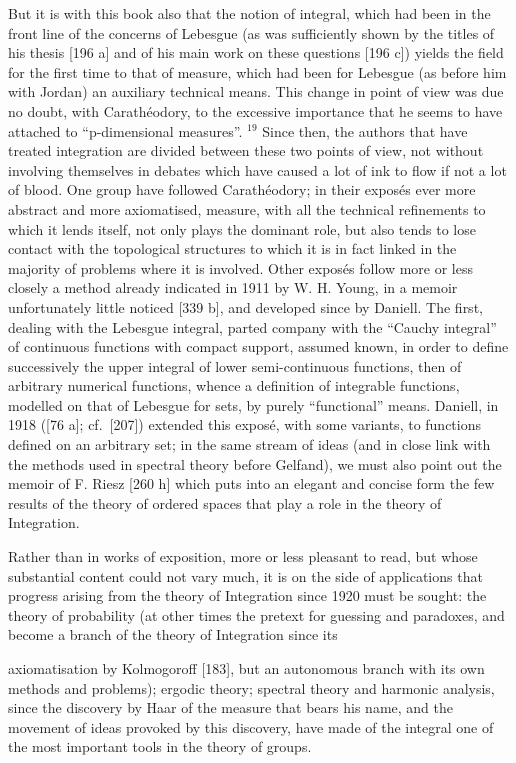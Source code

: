 But it is with this book also that the notion of integral, which had been in the front line of the concerns of Lebesgue (as was sufficiently shown by the titles of his thesis {[}196 a{]} and of his main work on these questions {[}196 c{]}) yields the field for the first time to that of measure, which had been for Lebesgue (as before him with Jordan) an auxiliary technical means. This change in point of view was due no doubt, with Carathéodory, to the excessive importance that he seems to have attached to ``p-dimensional measures''. \(^{19}\) Since then, the authors that have treated integration are divided between these two points of view, not without involving themselves in debates which have caused a lot of ink to flow if not a lot of blood. One group have followed Carathéodory; in their exposés ever more abstract and more axiomatised, measure, with all the technical refinements to which it lends itself, not only plays the dominant role, but also tends to lose contact with the topological structures to which it is in fact linked in the majority of problems where it is involved. Other exposés follow more or less closely a method already indicated in 1911 by W. H. Young, in a memoir unfortunately little noticed {[}339 b{]}, and developed since by Daniell. The first, dealing with the Lebesgue integral, parted company with the ``Cauchy integral'' of continuous functions with compact support, assumed known, in order to define successively the upper integral of lower semi-continuous functions, then of arbitrary numerical functions, whence a definition of integrable functions, modelled on that of Lebesgue for sets, by purely ``functional'' means. Daniell, in 1918 ({[}76 a{]}; cf.~{[}207{]}) extended this exposé, with some variants, to functions defined on an arbitrary set; in the same stream of ideas (and in close link with the methods used in spectral theory before Gelfand), we must also point out the memoir of F. Riesz {[}260 h{]} which puts into an elegant and concise form the few results of the theory of ordered spaces that play a role in the theory of Integration.

Rather than in works of exposition, more or less pleasant to read, but whose substantial content could not vary much, it is on the side of applications that progress arising from the theory of Integration since 1920 must be sought: the theory of probability (at other times the pretext for guessing and paradoxes, and become a branch of the theory of Integration since its

axiomatisation by Kolmogoroff {[}183{]}, but an autonomous branch with its own methods and problems); ergodic theory; spectral theory and harmonic analysis, since the discovery by Haar of the measure that bears his name, and the movement of ideas provoked by this discovery, have made of the integral one of the most important tools in the theory of groups.
